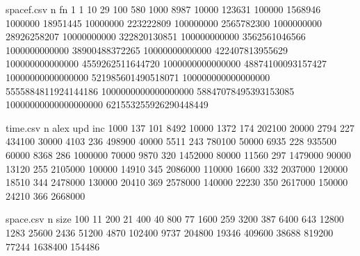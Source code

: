 
\begin{filecontents*}{spacef.csv}
n                        fn
1                        1
10                       29
100                      580
1000                     8987
10000                    123631
100000                   1568946
1000000                  18951445
10000000                 223222809
100000000                2565782300
1000000000               28926258207
10000000000              322820130851
100000000000             3562561046566
1000000000000            38900488372265
10000000000000           422407813955629
100000000000000          4559262511644720
1000000000000000         48874100093157427
10000000000000000        521985601490518071
100000000000000000       5555884811924144186
1000000000000000000      58847078495393153085
10000000000000000000     621553255926290448449
\end{filecontents*}

\begin{filecontents*}{time.csv}
n       alex   upd  inc
1000    137    101  8492
10000   1372   174  202100
20000   2794   227  434100
30000   4103   236  498900
40000   5511   243  780100
50000   6935   228  935500
60000   8368   286  1000000
70000   9870   320  1452000
80000   11560  297  1479000
90000   13120  255  2105000
100000  14910  345  2086000
110000  16600  332  2037000
120000  18510  344  2478000
130000  20410  369  2578000
140000  22230  350  2617000
150000  24210  366  2668000
\end{filecontents*}

\begin{filecontents*}{space.csv}
n       size
100     11
200     21
400     40
800     77
1600    259
3200    387
6400    643
12800   1283
25600   2436
51200   4870
102400  9737
204800  19346
409600  38688
819200  77244
1638400 154486
\end{filecontents*}

